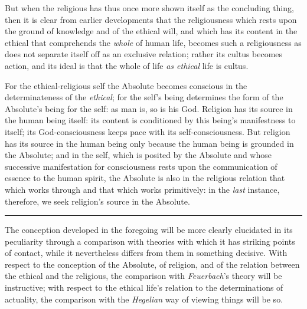 \documentclass[12pt,a4paper]{book}
\begin{document}
But when the religious has thus once more shown itself as the concluding
thing, then it is clear from earlier developments that the religiousness which
rests upon the ground of knowledge and of the ethical will, and which has its
content in the ethical that comprehends the \emph{whole} of human life,
becomes such a religiousness as does not separate itself off as an exclusive
relation; rather its cultus becomes action, and its ideal is that the whole of
life \emph{as ethical} life is cultus.

For the ethical-religious self the Absolute becomes conscious in the
determinateness of the \emph{ethical}; for the self's being determines the
form of the Absolute's being for the self: as man is, so is his God. Religion
has its source in the human being itself: its content is conditioned by this
being's manifestness to itself; its God-consciousness keeps pace with its
self-consciousness. But religion has its source in the human being only
because the human being is grounded in the Absolute; and in the self, which is
posited by the Absolute and whose successive manifestation for consciousness
rests upon the communication of essence\-%
\setcounter{footnote}{0}%
to the human spirit, the Absolute is also in the religious relation that which
works through and that which works primitively: in the \emph{last} instance,
therefore, we seek religion's source in the Absolute.

\begin{center}\rule{2cm}{0.4pt}\end{center}

The conception developed in the foregoing will be more clearly elucidated in
its peculiarity through a comparison with theories with which it has striking
points of contact, while it nevertheless differs from them in something
decisive. With respect to the conception of the Absolute, of religion, and of
the relation between the ethical and the religious, the comparison with
\emph{Feuerbach}'s theory will be instructive; with respect to the ethical
life's relation to the determinations of actuality, the comparison with the
\emph{Hegelian} way of viewing things will be so.
\end{document}
